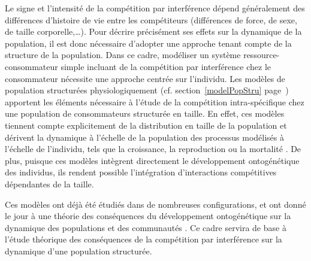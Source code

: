 Le signe et l'intensité de la compétition par interférence dépend généralement
des différences d'histoire de vie entre les compétiteurs (différences de force,
de sexe, de taille corporelle,\ldots). Pour décrire précisément ses effets sur
la dynamique de la population, il est donc nécessaire d'adopter une approche
tenant compte de la structure de la population. Dans ce cadre, modéliser un système ressource-consommateur simple
incluant de la compétition par interférence chez le consommateur nécessite une
approche centrée sur l'individu. Les modèles de population structurées physiologiquement (cf.
section~\ref{modelPopStru} page~\pageref{modelPopStru}) apportent les éléments
nécessaire à l'étude de la compétition intra-spécifique chez une population de
consommateurs structurée en taille. En effet, ces modèles tiennent compte
explicitement de la distribution en taille de la population et dérivent la
dynamique à l'échelle de la population des processus modélisés à l'échelle de
l'individu, tels que la croissance, la reproduction ou la mortalité
\autocites{kooijman1984a, metz1986a, de-roos1997a}. De plus, puisque ces modèles
intègrent directement le développement ontogénétique des individus, ils rendent
possible l'intégration d'interactions compétitives dépendantes de la taille.

Ces modèles ont déjà été
étudiés dans de nombreuses configurations, et ont donné le jour à une théorie
des conséquences du développement ontogénétique sur la dynamique des populations
et des communautés \autocites{de-roos2012a}. Ce cadre servira de base
à l'étude théorique des conséquences de la compétition par interférence sur la
dynamique d'une population structurée. 
